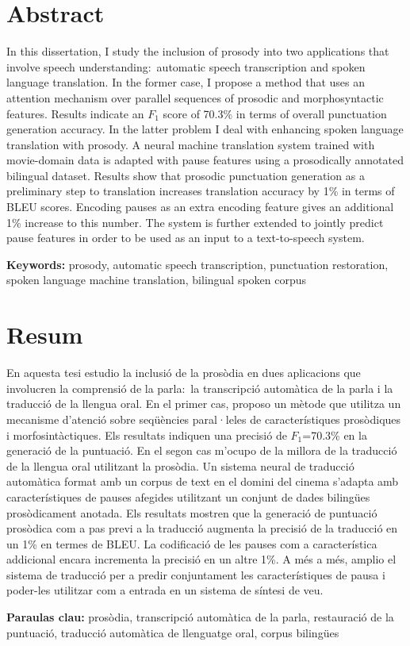 \section*{\Large \sffamily Abstract}

In this dissertation, I study the inclusion of prosody into two applications that involve speech understanding:~automatic speech transcription and spoken language translation. In the former case, I propose a method that uses an attention mechanism over parallel sequences of prosodic and morphosyntactic features. Results indicate an $F_1$ score of 70.3\% in terms of overall punctuation generation accuracy. In the latter problem I deal with enhancing spoken language translation with prosody. A neural machine translation system trained with movie-domain data is adapted with pause features using a prosodically annotated bilingual dataset. Results show that prosodic punctuation generation as a preliminary step to translation increases translation accuracy by 1\% in terms of BLEU scores. Encoding pauses as an extra encoding feature gives an additional 1\% increase to this number. The system is further extended to jointly predict pause features in order to be used as an input to a text-to-speech system. 

\textbf{Keywords:} prosody, automatic speech transcription, punctuation restoration, spoken language machine translation, bilingual spoken corpus

\vspace*{\fill}
\section*{\Large \sffamily  Resum}

En aquesta tesi estudio la inclusió de la prosòdia en dues aplicacions que involucren la comprensió de la parla:~la transcripció automàtica de la parla i la traducció de la llengua oral. En el primer cas, proposo un mètode que utilitza un mecanisme d’atenció sobre seqüències paral·leles de característiques prosòdiques i morfosintàctiques. Els resultats indiquen una precisió de $F_1$=70.3\% en la generació de la puntuació. En el segon cas m'ocupo de la millora de la traducció de la llengua oral utilitzant la prosòdia. Un sistema neural de traducció automàtica format amb un corpus de text en el domini del cinema s’adapta amb característiques de pauses afegides utilitzant un conjunt de dades bilingües prosòdicament anotada. Els resultats mostren que la generació de puntuació prosòdica com a pas previ a la traducció augmenta la precisió de la traducció en un 1\% en termes de BLEU. La codificació de les pauses com a característica addicional encara incrementa la precisió en un altre 1\%. A més a més, amplio el sistema de traducció per a predir conjuntament les característiques de pausa i poder-les utilitzar com a entrada en un sistema de síntesi de veu. 

\textbf{Paraulas clau:} prosòdia, transcripció automàtica de la parla, restauració de la puntuació, traducció automàtica de llenguatge oral, corpus bilingües

\vspace*{\fill}




